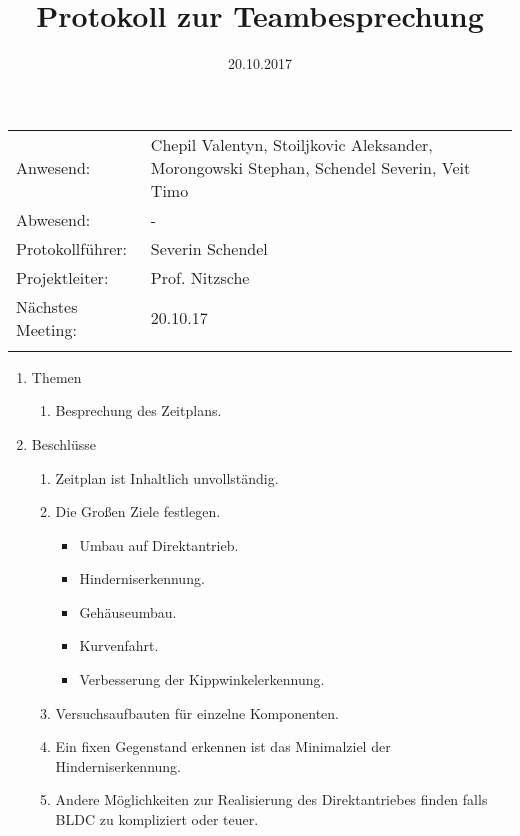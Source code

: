 \documentclass[10pt]{scrartcl}
\title{Protokoll zur Teambesprechung}
\date{20.10.2017}%
\begin{document}
\maketitle
\thispagestyle{empty}

\begin{tabularx}{\textwidth}{lp{10 cm}} 
Anwesend: & Chepil Valentyn, Stoiljkovic Aleksander, Morongowski Stephan, Schendel Severin, Veit Timo\\%
Abwesend: & - \\
Protokollführer: & Severin Schendel \\
Projektleiter: & Prof. Nitzsche\\
Nächstes Meeting: & 20.10.17 \\%
&\\
\end{tabularx}

\begin{enumerate}
	\item Themen
		\begin{enumerate}
			\item Besprechung des Zeitplans.%
		\end{enumerate}
	\item Beschlüsse
		\begin{enumerate}
			\item Zeitplan ist Inhaltlich unvollständig.%
			\item Die Großen Ziele festlegen.
			\begin{itemize}
				\item Umbau auf Direktantrieb. 
				\item Hinderniserkennung.
				\item Gehäuseumbau.
				\item Kurvenfahrt.
				\item Verbesserung der Kippwinkelerkennung.
			\end{itemize}
			\item Versuchsaufbauten für einzelne Komponenten.
			\item Ein fixen Gegenstand erkennen ist das Minimalziel der Hinderniserkennung.
			\item Andere Möglichkeiten zur Realisierung des Direktantriebes finden falls BLDC zu kompliziert oder teuer.
		\end{enumerate}

	\end{enumerate}
\end{document}
